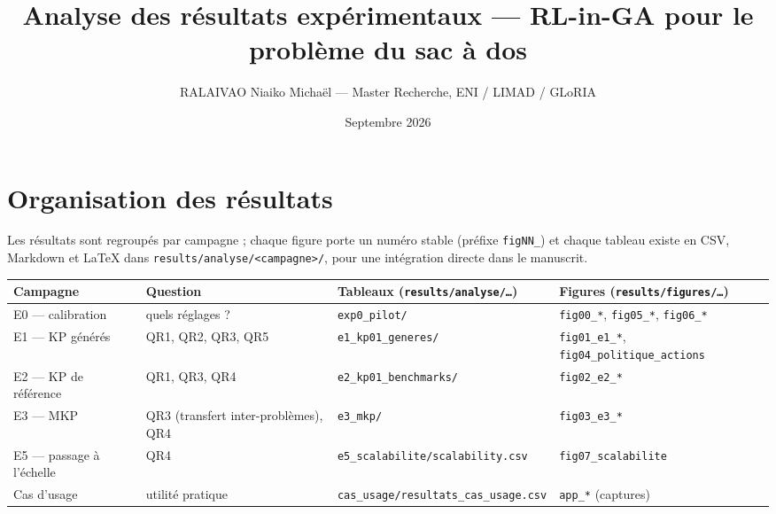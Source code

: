 \documentclass[
  french,
  11pt,
  a4paper,
]{article}
\title{Analyse des résultats expérimentaux --- RL-in-GA pour le problème
du sac à dos}
\author{RALAIVAO Niaiko Michaël --- Master Recherche, ENI / LIMAD /
GLoRIA}
\date{Septembre 2026}
\newcounter{none} %
\begin{document}
\maketitle

{
\setcounter{tocdepth}{3}
\tableofcontents
}
\section{Organisation des
résultats}\label{analyse_resultats-organisation-des-ruxe9sultats}

Les résultats sont regroupés par campagne ; chaque figure porte un
numéro stable (préfixe \texttt{figNN\_}) et chaque tableau existe en
CSV, Markdown et LaTeX dans
\texttt{results/analyse/\textless{}campagne\textgreater{}/}, pour une
intégration directe dans le manuscrit.

{\def\LTcaptype{none} %
\begin{longtable}[]{@{}
  >{\raggedright\arraybackslash}p{}
  >{\raggedright\arraybackslash}p{}
  >{\raggedright\arraybackslash}p{}
  >{\raggedright\arraybackslash}p{}@{}}
\toprule\noalign{}
\begin{minipage}[b]{\linewidth}\raggedright
Campagne
\end{minipage} & \begin{minipage}[b]{\linewidth}\raggedright
Question
\end{minipage} & \begin{minipage}[b]{\linewidth}\raggedright
Tableaux (\texttt{results/analyse/…})
\end{minipage} & \begin{minipage}[b]{\linewidth}\raggedright
Figures (\texttt{results/figures/…})
\end{minipage} \\
\midrule\noalign{}
\endhead
\bottomrule\noalign{}
\endlastfoot
E0 --- calibration & quels réglages ? & \texttt{exp0\_pilot/} &
\texttt{fig00\_*}, \texttt{fig05\_*}, \texttt{fig06\_*} \\
E1 --- KP générés & QR1, QR2, QR3, QR5 & \texttt{e1\_kp01\_generes/} &
\texttt{fig01\_e1\_*}, \texttt{fig04\_politique\_actions} \\
E2 --- KP de référence & QR1, QR3, QR4 & \texttt{e2\_kp01\_benchmarks/}
& \texttt{fig02\_e2\_*} \\
E3 --- MKP & QR3 (transfert inter-problèmes), QR4 & \texttt{e3\_mkp/} &
\texttt{fig03\_e3\_*} \\
E5 --- passage à l'échelle & QR4 &
\texttt{e5\_scalabilite/scalability.csv} &
\texttt{fig07\_scalabilite} \\
Cas d'usage & utilité pratique &
\texttt{cas\_usage/resultats\_cas\_usage.csv} & \texttt{app\_*}
(captures) \\
\end{longtable}
}
\end{document}
